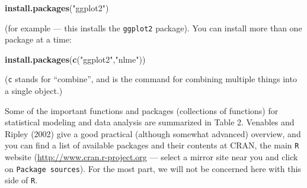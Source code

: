 \documentclass[11pt,]{article}
\newenvironment{Shaded}{\begin{snugshade}}{\end{snugshade}}
\newcommand{\KeywordTok}[1]{\textcolor[rgb]{0.13,0.29,0.53}{\textbf{#1}}}
\newcommand{\NormalTok}[1]{#1}
\newcommand{\StringTok}[1]{\textcolor[rgb]{0.31,0.60,0.02}{#1}}
\begin{document}
\begin{Shaded}
\begin{Highlighting}[]
\KeywordTok{install.packages}\NormalTok{(}\StringTok{"ggplot2"}\NormalTok{)}
\end{Highlighting}
\end{Shaded}

(for example --- this installs the \texttt{ggplot2} package). You can install more than one package at a time:

\begin{Shaded}
\begin{Highlighting}[]
\KeywordTok{install.packages}\NormalTok{(}\KeywordTok{c}\NormalTok{(}\StringTok{"ggplot2"}\NormalTok{,}\StringTok{"nlme"}\NormalTok{))}
\end{Highlighting}
\end{Shaded}

(\texttt{c} stands for ``combine'', and is the command for combining multiple things into a single object.)

Some of the important functions and packages (collections of functions) for statistical modeling and data analysis are summarized in Table 2. Venables and Ripley (2002) give a good practical (although somewhat advanced) overview, and you can find a list of available packages and their contents at CRAN, the main \texttt{R} website (\url{http://www.cran.r-project.org} --- select a mirror site near you and click on \texttt{Package\ sources}). For the most part, we will not be concerned here with this side of \texttt{R}.
\end{document}
